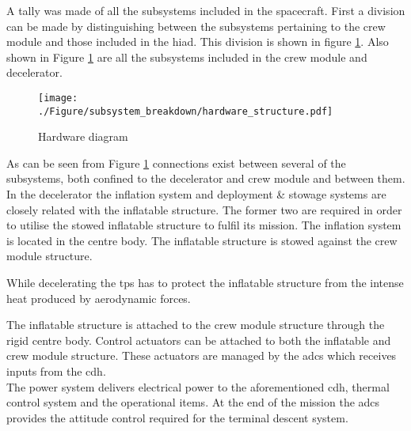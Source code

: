 A tally was made of all the subsystems included in the spacecraft. First a division can be made by distinguishing between the subsystems pertaining to the crew module and those included in the \gls{hiad}. This division is shown in figure \ref{fig:subsystems}. Also shown in Figure \ref{fig:subsystems} are all the subsystems included in the crew module and decelerator.
\begin{figure}[h]
	\texttt{[image: ./Figure/subsystem\_breakdown/hardware\_structure.pdf]}
	\caption{Hardware diagram}
	\label{fig:subsystems} 
\end{figure}
%
%
%
%
%
%

As can be seen from Figure \ref{fig:subsystems} connections exist between several of the subsystems, both confined to the decelerator and crew module and between them. In the decelerator the inflation system and deployment \& stowage systems are closely related with the inflatable structure. The former two are required in order to utilise the stowed inflatable structure to fulfil its mission. The inflation system is located in the centre body. The inflatable structure is stowed against the crew module structure.

While decelerating the \gls{tps} has to protect the inflatable structure from the intense heat produced by aerodynamic forces. %

The inflatable structure is attached to the crew module structure through the rigid centre body. Control actuators can be attached to both the inflatable and crew module structure. These actuators are managed by the \gls{adcs} which receives inputs from the \gls{cdh}.\\
The power system delivers electrical power to the aforementioned \gls{cdh}, thermal control system and the operational items. At the end of the mission the \gls{adcs} provides the attitude control required for the terminal descent system.